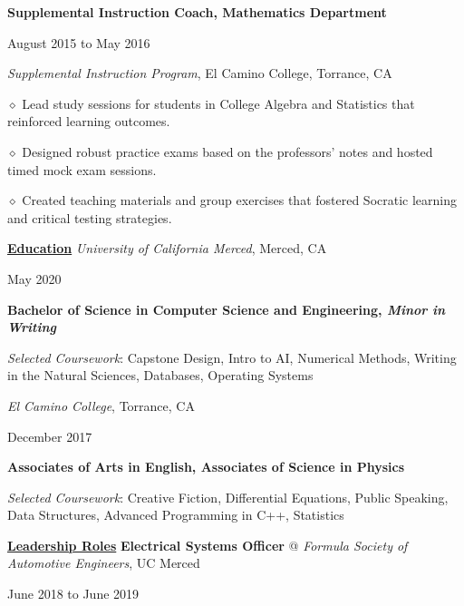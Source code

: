 \documentclass [11pt]{article}
\begin{document}
\begin{flushleft}
\linebreak
\textbf{Supplemental Instruction Coach, Mathematics Department}\begin{minipage}{0.475 \linewidth}\begin{flushright}August 2015 to May 2016\end{flushright}\end{minipage}
\emph{Supplemental Instruction Program}, El Camino College, Torrance, CA

‭‭\quad\quad\quad$\diamond$ ‭Lead study sessions for students in College Algebra and Statistics that reinforced learning outcomes.

‭‭\quad\quad\quad$\diamond$ Designed robust practice exams based on the professors’ notes and hosted timed mock exam sessions.

‭‭\quad\quad\quad$\diamond$ Created teaching materials and group exercises that fostered Socratic learning and critical testing strategies.

\linebreak
\underline{\textbf{Education}}
\linebreak
\emph{University of California Merced}, Merced, CA\begin{minipage}{0.63 \linewidth}\begin{flushright}May 2020\end{flushright}\end{minipage}
\textbf{Bachelor of Science in Computer Science and Engineering, \emph{Minor in Writing}}

\raggedleft
\footnotesize{\emph{Selected Coursework}: Capstone Design, Intro to AI, Numerical Methods, Writing in the Natural Sciences, Databases, Operating Systems}
\normalsize
\linebreak

\raggedright
\emph{El Camino College}, Torrance, CA\begin{minipage}{0.725 \linewidth}\begin{flushright}December 2017\end{flushright}\end{minipage}

\textbf{Associates of Arts in English, Associates of Science in Physics}

\raggedleft
\footnotesize{\emph{Selected Coursework}: Creative Fiction, Differential Equations, Public Speaking, Data Structures, Advanced Programming in C++, Statistics}
\normalsize

\linebreak
\raggedright
\underline{\textbf{Leadership Roles}}
\linebreak
\textbf{Electrical Systems Officer} @ \emph{Formula Society of Automotive Engineers}, UC Merced \begin{minipage}{0.300 \linewidth}\begin{flushright}June 2018 to June 2019\end{flushright}\end{minipage}


\end{flushleft}
\end{document}
